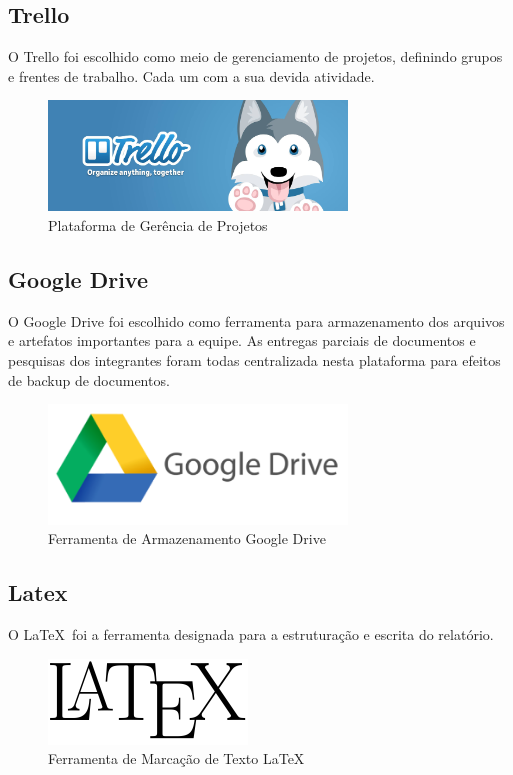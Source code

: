 \subsection{Trello}
O Trello foi escolhido como meio de gerenciamento de projetos, definindo grupos e
frentes de trabalho. Cada um com a sua devida atividade.

\begin{figure}[h]
  \centering
  \includegraphics[width=300px, scale=0.5]{figuras/trello1}
  \caption{Plataforma de Gerência de Projetos}
  \label{table:trello1}
\end{figure}


\subsection{Google Drive}
O Google Drive foi escolhido como ferramenta para armazenamento dos arquivos e artefatos importantes para a
equipe. As entregas parciais de documentos e pesquisas dos integrantes foram todas centralizada nesta plataforma
para efeitos de backup de documentos.
\begin{figure}[h]
  \centering
  \includegraphics[width=300px, scale=0.5]{figuras/google_drive-logo}
  \caption{Ferramenta de Armazenamento Google Drive}
  \label{table:google_drive-logo}
\end{figure}
\subsection{Latex}
O \LaTeX\ foi a ferramenta designada para a estruturação e escrita do relatório.
\begin{figure}[h]
  \centering
  \includegraphics[width=200px, scale=0.5]{figuras/latex_logo}
  \caption{Ferramenta de Marcação de Texto LaTeX}
  \label{table:latex_logo}
\end{figure}
